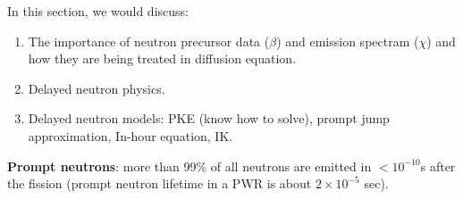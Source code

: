\documentclass{school-22.211-notes}
\date{April 25, 2012}
\begin{document}
\maketitle

 \label{PKE-without-feedback}
In this section, we would discuss: 
\begin{enumerate}
\item The importance of neutron precursor data ($\beta$) and emission spectram ($\chi$) and how they are being treated in diffusion equation. 

\item Delayed neutron physics. 

\item Delayed neutron models: PKE (know how to solve), prompt jump approximation, In-hour equation, IK. 
\end{enumerate}


\textbf{Prompt neutrons}: more than 99\% of all neutrons are emitted in $<10^{-10}$s after the fission (prompt neutron lifetime in a PWR is about $2 \times 10^{-5}$ sec). 
\end{document}
